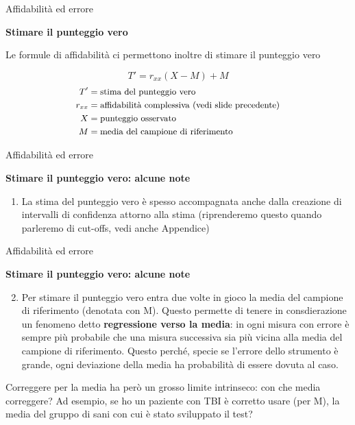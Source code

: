 \documentclass[
  ignorenonframetext,
]{beamer}
\providecommand{\tightlist}{%
  \setlength{\itemsep}{0pt}\setlength{\parskip}{0pt}}
\begin{document}
\begin{frame}{Affidabilità ed errore}
\label{affidabilituxe0-ed-errore-4}
\begin{center}
  \textbf{Stimare il punteggio vero}
\end{center}

Le formule di affidabilità ci permettono inoltre di stimare il punteggio
vero

\[
T'=r_{xx}(X-M)+M
\] \[
\small
\begin{aligned}
T' & = \text{stima del punteggio vero} \\
r_{xx} & = \text{affidabilità complessiva (vedi slide precedente)} \\
X & = \text{punteggio osservato} \\
M & = \text{media del campione di riferimento} \\
\end{aligned}
\]
\end{frame}

\begin{frame}{Affidabilità ed errore}
\label{affidabilituxe0-ed-errore-5}
\begin{center}
  \textbf{Stimare il punteggio vero: alcune note}
\end{center}

\begin{enumerate}
[1)]
\tightlist
\item
  La stima del punteggio vero è spesso accompagnata anche dalla
  creazione di intervalli di confidenza attorno alla stima (riprenderemo
  questo quando parleremo di cut-offs, vedi anche Appendice)
\end{enumerate}
\end{frame}

\begin{frame}{Affidabilità ed errore}
\label{affidabilituxe0-ed-errore-6}
\begin{center}
  \textbf{Stimare il punteggio vero: alcune note}
\end{center}

\small

\begin{enumerate}
[1)]
\setcounter{enumi}{1}
\tightlist
\item
  Per stimare il punteggio vero entra due volte in gioco la media del
  campione di riferimento (denotata con M). Questo permette di tenere in
  consdierazione un fenomeno detto \textbf{regressione verso la media}:
  in ogni misura con errore è sempre più probabile che una misura
  successiva sia più vicina alla media del campione di riferimento.
  Questo perché, specie se l'errore dello strumento è grande, ogni
  deviazione della media ha probabilità di essere dovuta al caso.
\end{enumerate}

Correggere per la media ha però un grosso limite intrinseco: con che
media correggere? Ad esempio, se ho un paziente con TBI è corretto usare
(per M), la media del gruppo di sani con cui è stato sviluppato il test?
\end{frame}
\end{document}
